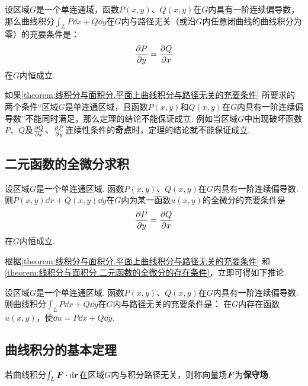\begin{theorem}\label{theorem:线积分与面积分.平面上曲线积分与路径无关的充要条件}
设区域\(G\)是一个单连通域，函数\(P(x,y)\)、\(Q(x,y)\)在\(G\)内具有一阶连续偏导数，那么曲线积分\(\int_L P\dd{x}+Q\dd{y}\)在\(G\)内与路径无关（或沿\(G\)内任意闭曲线的曲线积分为零）的充要条件是：\[
\pdv{P}{y}=\pdv{Q}{x}
\]在\(G\)内恒成立.
\end{theorem}
如果\cref{theorem:线积分与面积分.平面上曲线积分与路径无关的充要条件} 所要求的两个条件“区域\(G\)是单连通区域，且函数\(P(x,y)\)和\(Q(x,y)\)在\(G\)内具有一阶连续偏导数”不能同时满足，那么定理的结论不能保证成立.
例如当区域\(G\)中出现破坏函数\(P\)、\(Q\)及\(\pdv{Q}{x}\)、\(\pdv{P}{y}\)连续性条件的\textbf{奇点}时，定理的结论就不能保证成立.

\subsection{二元函数的全微分求积}
\begin{theorem}\label{theorem:线积分与面积分.二元函数的全微分的存在条件}
设区域\(G\)是一个单连通区域.
函数\(P(x,y)\)、\(Q(x,y)\)在\(G\)内具有一阶连续偏导数.
则\(P(x,y)\dd{x}+Q(x,y)\dd{y}\)在\(G\)内为某一函数\(u(x,y)\)的全微分的充要条件是\[
\pdv{P}{y}=\pdv{Q}{x}
\]在\(G\)内恒成立.
\end{theorem}

根据\cref{theorem:线积分与面积分.平面上曲线积分与路径无关的充要条件} 和\cref{theorem:线积分与面积分.二元函数的全微分的存在条件}，立即可得如下推论.
\begin{corollary}
设区域\(G\)是一个单连通区域.
函数\(P(x,y)\)、\(Q(x,y)\)在\(G\)内具有一阶连续偏导数.
则曲线积分\(\int_L{P\dd{x}+Q\dd{y}}\)在\(G\)内与路径无关的充要条件是：
在\(G\)内存在函数\(u(x,y)\)，使\(\dd{u}=P\dd{x}+Q\dd{y}\).
\end{corollary}

\subsection{曲线积分的基本定理}
\begin{definition}
若曲线积分\(\int_L \boldsymbol{F}\cdot\dd{\boldsymbol{r}}\)在区域\(G\)内与积分路径无关，则称向量场\(\boldsymbol{F}\)为\textbf{保守场}.
\end{definition}


